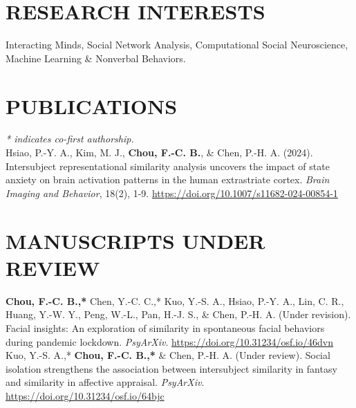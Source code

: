\documentclass[a4paper,12pt]{article}
\newcommand{\sectionspace}{0pt} %
\newcommand{\itemspace}{7pt} %
\begin{document}
\vspace{\sectionspace}

\section*{RESEARCH INTERESTS}
Interacting Minds, Social Network Analysis, Computational Social Neuroscience, Machine Learning \& Nonverbal Behaviors. \\[\sectionspace]

\section*{PUBLICATIONS}
\textit{* indicates co-first authorship.} \\[10pt]
\noindent
Hsiao, P.-Y. A., Kim, M. J., \textbf{Chou, F.-C. B.}, \& Chen, P.-H. A. (2024). Intersubject representational similarity analysis uncovers the impact of state anxiety on brain activation patterns in the human extrastriate cortex. \textit{Brain Imaging and Behavior}, 18(2), 1-9. \href{https://doi.org/10.1007/s11682-024-00854-1}{https://doi.org/10.1007/s11682-024-00854-1}
\\[\itemspace]

\section*{MANUSCRIPTS UNDER REVIEW}
\noindent\textbf{Chou, F.-C. B.,*} Chen, Y.-C. C.,* Kuo, Y.-S. A., Hsiao, P.-Y. A., Lin, C. R., Huang, Y.-W. Y., Peng, W.-L., Pan, H.-J. S., \& Chen, P.-H. A. (Under revision). Facial insights: An exploration of similarity in spontaneous facial behaviors during pandemic lockdown. \textit{PsyArXiv}. \href{https://doi.org/10.31234/osf.io/46dvn} {https://doi.org/10.31234/osf.io/46dvn}\\[\itemspace]
\noindent Kuo, Y.-S. A.,* \textbf{Chou, F.-C. B.,*} \& Chen, P.-H. A. (Under review). Social isolation strengthens the association between intersubject similarity in fantasy and similarity in affective appraisal. \textit{PsyArXiv}. \href{https://doi.org/10.31234/osf.io/64bjc} {https://doi.org/10.31234/osf.io/64bjc}\\[\itemspace]
\end{document}
